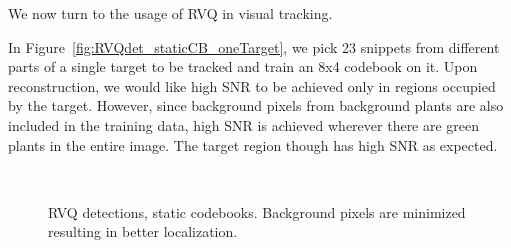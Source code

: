 We now turn to the usage of RVQ in visual tracking.  

In Figure~\ref{fig:RVQdet_staticCB_oneTarget}, we pick 23 snippets from different parts of a single target to be tracked and train an 8x4 codebook on it.  Upon reconstruction, we would like high SNR to be achieved only in regions occupied by the target.  However, since background pixels from background plants are also included in the training data, high SNR is achieved wherever there are green plants in the entire image.  The target region though has high SNR as expected.  

								\begin{figure}[t]
								\centering	
								\\
								\caption{RVQ detections, static codebooks.  Background pixels are minimized resulting in better localization.}										
								\label{RVQdet_staticCB_manyTargets}				
								\end{figure}


